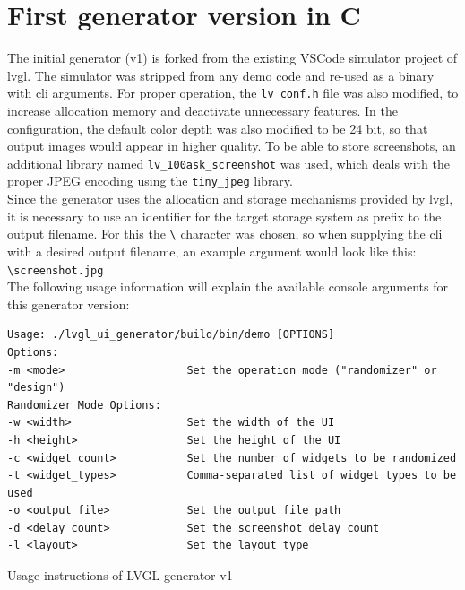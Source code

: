 \documentclass[Bachelor, BIC, english, fhCitStyle, IEEE]{BASE/twbook} %
\def\code#1{\texttt{#1}}
\begin{document}
\section{First generator version in C}
The initial generator (v1) is forked from the existing VSCode simulator project of \ac{lvgl}. The simulator was stripped from any demo code and re-used as a binary with \ac{cli} arguments. For proper operation, the \code{lv\_conf.h} file was also modified, to increase allocation memory and deactivate unnecessary features. In the configuration, the default color depth was also modified to be 24 bit, so that output images would appear in higher quality. To be able to store screenshots, an additional library named \code{lv\_100ask\_screenshot} was used, which deals with the proper JPEG encoding using the \code{tiny\_jpeg} library.\\
Since the generator uses the allocation and storage mechanisms provided by \ac{lvgl}, it is necessary to use an identifier for the target storage system as prefix to the output filename. For this the \code{\textbackslash} character was chosen, so when supplying the \ac{cli} with a desired output filename, an example argument would look like this: \code{\textbackslash screenshot.jpg}\\
The following usage information will explain the available console arguments for this generator version:
\begin{listing}[htbp]
    \begin{verbatim}
Usage: ./lvgl_ui_generator/build/bin/demo [OPTIONS]
Options:
-m <mode>                   Set the operation mode ("randomizer" or "design")
Randomizer Mode Options:
-w <width>                  Set the width of the UI
-h <height>                 Set the height of the UI
-c <widget_count>           Set the number of widgets to be randomized
-t <widget_types>           Comma-separated list of widget types to be used
-o <output_file>            Set the output file path
-d <delay_count>            Set the screenshot delay count
-l <layout>                 Set the layout type
    \end{verbatim}
    \caption{Usage instructions of LVGL generator v1}
\end{listing}
\\
\end{document}
